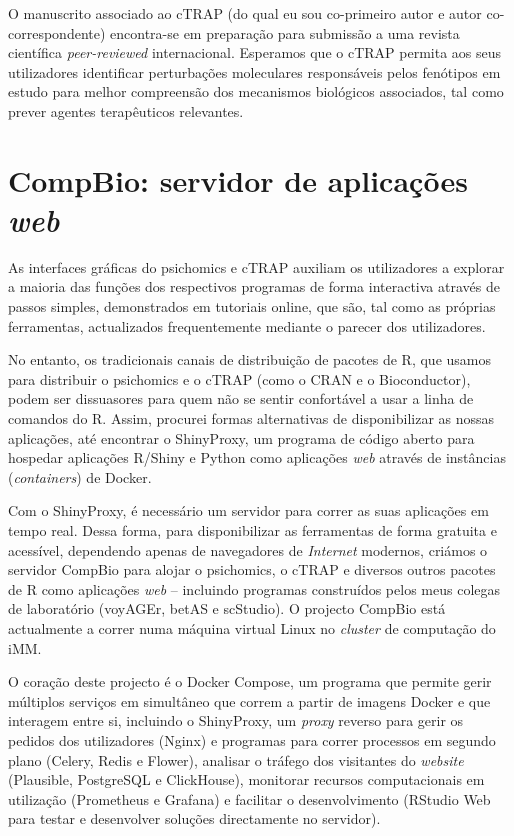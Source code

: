O manuscrito associado ao cTRAP (do qual eu sou co-primeiro autor e autor co-correspondente) encontra-se em preparação para submissão a uma revista científica \emph{peer-reviewed} internacional. Esperamos que o cTRAP permita aos seus utilizadores identificar perturbações moleculares responsáveis pelos fenótipos em estudo para melhor compreensão dos mecanismos biológicos associados, tal como prever agentes terapêuticos relevantes.

\section*{CompBio: servidor de aplicações \emph{web}}

As interfaces gráficas do psichomics e cTRAP auxiliam os utilizadores a explorar a maioria das funções dos respectivos programas de forma interactiva através de passos simples, demonstrados em tutoriais online, que são, tal como as próprias ferramentas, actualizados frequentemente mediante o parecer dos utilizadores.

No entanto, os tradicionais canais de distribuição de pacotes de R, que usamos para distribuir o psichomics e o cTRAP (como o CRAN e o Bioconductor), podem ser dissuasores para quem não se sentir confortável a usar a linha de comandos do R. Assim, procurei formas alternativas de disponibilizar as nossas aplicações, até encontrar o ShinyProxy, um programa de código aberto para hospedar aplicações R/Shiny e Python como aplicações \emph{web} através de instâncias (\emph{containers}) de Docker.

Com o ShinyProxy, é necessário um servidor para correr as suas aplicações em tempo real. Dessa forma, para disponibilizar as ferramentas de forma gratuita e acessível, dependendo apenas de navegadores de \emph{Internet} modernos, criámos o servidor CompBio para alojar o psichomics, o cTRAP e diversos outros pacotes de R como aplicações \emph{web} -- incluindo programas construídos pelos meus colegas de laboratório (voyAGEr, betAS e scStudio). O projecto CompBio está actualmente a correr numa máquina virtual Linux no \emph{cluster} de computação do iMM.

O coração deste projecto é o Docker Compose, um programa que permite gerir múltiplos serviços em simultâneo que correm a partir de imagens Docker e que interagem entre si, incluindo o ShinyProxy, um \emph{proxy} reverso para gerir os pedidos dos utilizadores (Nginx) e programas para correr processos em segundo plano (Celery, Redis e Flower), analisar o tráfego dos visitantes do \emph{website} (Plausible, PostgreSQL e ClickHouse), monitorar recursos computacionais em utilização (Prometheus e Grafana) e facilitar o desenvolvimento (RStudio Web para testar e desenvolver soluções directamente no servidor).

